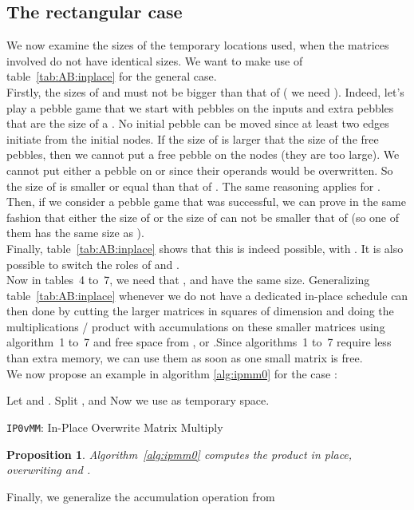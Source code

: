 \documentclass{article}
\newtheorem{prop}{Proposition}
\begin{document}
\subsection{The rectangular case}\label{ssec:overwrite:gen}
We now examine the sizes of the temporary locations used, when the
matrices involved do not have identical sizes. We want to make use of
table~\ref{tab:AB:inplace} for the general case.\\
Firstly, the sizes of  and  must not be bigger than that of  (\ie{} we need ). Indeed, let's play a pebble game that we start with pebbles on the inputs and   extra pebbles that are the size of a . No initial pebble can be moved since at least two edges initiate from the initial nodes. If the size of  is larger that the size of the free pebbles, then we cannot put a free pebble on the  nodes (they are too large). We cannot put either a pebble on  or  since their operands would be overwritten. So the size of  is smaller or equal than that of . The same reasoning applies for .\\ 
Then, if we consider a pebble game that was successful, we can prove in the same fashion that either the size of  or the size of  can not be smaller that of  (so one of them has the same size as ).\\
Finally, table~\ref{tab:AB:inplace} shows that this is indeed possible, with
. It is also possible  to switch the roles of  and . \\
Now in tables~4 to~7, we need that ,  and  have the same size.
Generalizing table~\ref{tab:AB:inplace} whenever we do not have a dedicated
in-place schedule can then done by cutting the larger matrices in squares of
dimension  and doing the multiplications / product with accumulations on
these smaller matrices using
algorithm~1 to~7 and free space from ,  or .Since algorithms~1 to~7 require less than  extra memory, we can use them as soon as one small matrix is free.\\
We now propose an example in algorithm \ref{alg:ipmm0} for the case :
\begin{algorithm}[htb] \begin{algorithmic}[1]
		\Ensure{}
\State Let  and .
		\State Split ,  and 
		\State  {}
		\State Now we use   as temporary space.
		\For {}
		\State  {} 
		\EndFor
		\For {}
		\For {} 
		\State  {}
		\EndFor
		\EndFor
\end{algorithmic}
	\caption{\texttt{IP0vMM}: In-Place Overwrite Matrix Multiply}\label{alg:ipmm0}
\end{algorithm}\begin{prop}
	Algorithm~\ref{alg:ipmm0} computes the product  in place, overwriting  and .
\end{prop}Finally, we generalize the accumulation operation from
\end{document}
